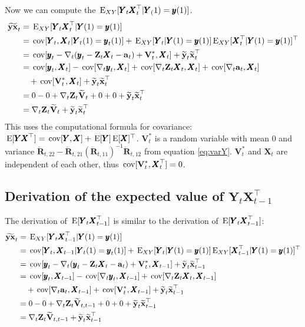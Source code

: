 \documentclass[]{article}
\def\XI{\mbox{\boldmath $\Xi$}}
\def\E{\,\textup{\textrm{E}}}
\def\RR{\mbox{$\mathbf R$}}	 \def\rr{\mbox{$\mathbf r$}} \def\Rb{\mbox{$\mathbf H$}}	\def\Rm{\mathbb{R}}
\def\VV{\mbox{$\mathbf V$}}	\def\vv{\mbox{$\mathbf v$}}
\def\XX{\mbox{$\pmb{X}$}}	\def\xx{\mbox{$\pmb{x}$}}
\def\YY{\mbox{$\pmb{Y}$}}	\def\yy{\mbox{$\pmb{y}$}}
\def\ZZ{\mbox{$\mathbf Z$}}	\def\zz{\mbox{$\mathbf z$}}	\def\Zb{\mbox{$\mathbf M$}} \def\Za{\mbox{$\mathbf N$}} \def\Zm{\XI}
\def\cov{\,\textup{\textrm{cov}}}
\def\hatxt{\widetilde{\mbox{$\mathbf x$}}_t}
\def\hatxtm{\widetilde{\mbox{$\mathbf x$}}_{t-1}}
\def\hatyt{\widetilde{\mbox{$\mathbf y$}}_t}
\def\hatYXt{\widetilde{\mbox{$\mathbf{y}\mathbf{x}$}}_t}
\def\hatVt{\widetilde{\VV}_t}
\def\hatVttm{\widetilde{\VV}_{t,t-1}}
\def\IR{\nabla}
\begin{document}
Now we can compute the $\E_{XY}[\YY_t\XX_t^\top|\YY_(1)=\yy(1)]$.  
\begin{equation}
\begin{split}
\hatYXt&=\E_{XY}[\YY_t\XX_t^\top|\YY(1)=\yy(1)]\\
&=\cov[\YY_t,\XX_t|\YY_t(1)=\yy_t(1)]+\E_{XY}[\YY_t|\YY(1)=\yy(1)]\E_{XY}[\XX_t^\top|\YY(1)=\yy(1)]^\top\\
&=\cov[\yy_t-\IR_t(\yy_t-\ZZ_t\XX_t-\aa_t)+\VV^*_t,\XX_t]+\hatyt\hatxt^\top \\
&=\cov[\yy_t,\XX_t]-\cov[\IR_t\yy_t,\XX_t]+\cov[\IR_t\ZZ_t\XX_t,\XX_t] +\cov[\IR_t\aa_t,\XX_t]\\
&\quad + \cov[\VV^*_t,\XX_t]+\hatyt\hatxt^\top \\
&=0 - 0 + \IR_t\ZZ_t\hatVt + 0 + 0 + \hatyt\hatxt^\top \\
&= \IR_t\ZZ_t\hatVt + \hatyt\hatxt^\top
\end{split}
\end{equation}
This uses the computational formula for covariance: $\E[\YY\XX^\top]=\cov[\YY,\XX]+\E[\YY]\E[\XX]^\top$. $\VV^*_t$ is a random variable with mean 0 and variance $\ddot{\RR}_{t,22} - \ddot{\RR}_{t,21}(\ddot{\RR}_{t,11})^{-1}\ddot{\RR}_{t,12}$ from equation \ref{eq:varY}.  $\VV^*_t$ and $\XX_t$ are independent of each other, thus $\cov[\VV^*_t,\XX_t^\top]=0$.

\subsection{Derivation of the expected value of $\YY_t\XX_{t-1}^\top$}
The derivation of $\E[\YY_t\XX_{t-1}^\top]$ is similar to the derivation of $\E[\YY_t\XX_{t-1}^\top]$:
\begin{equation}
\begin{split}
\hatYXt&=\E_{XY}[\YY_t\XX_{t-1}^\top|\YY(1)=\yy(1)]\\
&=\cov[\YY_t,\XX_{t-1}|\YY_t(1)=\yy_t(1)] + \E_{XY}[\YY_t|\YY(1)=\yy(1)]\E_{XY}[\XX_{t-1}^\top|\YY(1)=\yy(1)]^\top\\
&=\cov[\yy_t-\IR_t(\yy_t-\ZZ_t\XX_t-\aa_t)+\VV^*_t,\XX_{t-1}]+\hatyt\hatxtm^\top \\
&=\cov[\yy_t,\XX_{t-1}]-\cov[\IR_t\yy_t,\XX_{t-1}]+\cov[\IR_t\ZZ_t\XX_t,\XX_{t-1}] \\
&\quad +\cov[\IR_t\aa_t,\XX_{t-1}] + \cov[\VV^*_t,\XX_{t-1}]+\hatyt\hatxtm^\top \\
&=0 - 0 + \IR_t\ZZ_t\hatVttm + 0 + 0 + \hatyt\hatxtm^\top \\
&= \IR_t\ZZ_t\hatVttm + \hatyt\hatxtm^\top
\end{split}
\end{equation}
\end{document}
